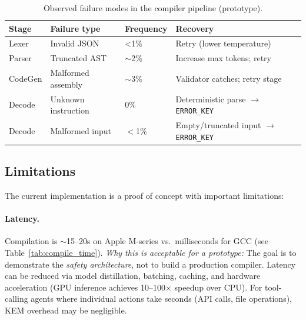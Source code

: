 \documentclass[11pt]{article}
\begin{document}
\begin{table}[h]
\centering
\caption{Observed failure modes in the compiler pipeline (prototype).}
\label{tab:failure_modes}
\begin{tabular}{p{2.2cm}p{4.2cm}p{2.2cm}p{5.2cm}}
\toprule
Stage & Failure type & Frequency & Recovery \\
\midrule
Lexer & Invalid JSON & <1\% & Retry (lower temperature) \\
Parser & Truncated AST & $\sim$2\% & Increase max tokens; retry \\
CodeGen & Malformed assembly & $\sim$3\% & Validator catches; retry stage \\
Decode & Unknown instruction & 0\% & Deterministic parse $\rightarrow$ \texttt{ERROR\_KEY} \\
Decode & Malformed input & $<$1\% & Empty/truncated input $\rightarrow$ \texttt{ERROR\_KEY} \\
\bottomrule
\end{tabular}
\end{table}

\subsection{Limitations}
The current implementation is a proof of concept with important limitations:

\paragraph{Latency.}
Compilation is $\sim$15--20s on Apple M-series vs.\ milliseconds for GCC (see Table~\ref{tab:compile_time}).
\emph{Why this is acceptable for a prototype:} The goal is to demonstrate the \emph{safety architecture}, not to build a production compiler.
Latency can be reduced via model distillation, batching, caching, and hardware acceleration (GPU inference achieves 10--100$\times$ speedup over CPU).
For tool-calling agents where individual actions take seconds (API calls, file operations), KEM overhead may be negligible.
\end{document}
